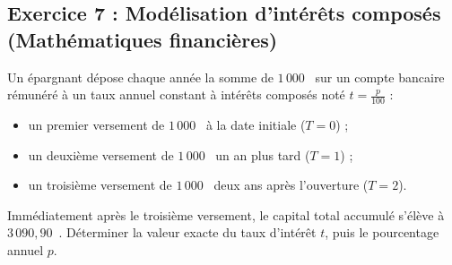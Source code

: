 \documentclass[11pt,a4paper]{article}
\providecommand{\euro}{\text{\officialeuro}}
\begin{document}
\subsection*{Exercice 7 : Modélisation d'intérêts composés (Mathématiques financières)}
Un épargnant dépose chaque année la somme de $1\,000$~\euro{} sur un compte bancaire rémunéré à un taux annuel constant à intérêts composés noté $t = \frac{p}{100}$ :
\begin{itemize}
    \item un premier versement de $1\,000$~\euro{} à la date initiale ($T = 0$) ;
    \item un deuxième versement de $1\,000$~\euro{} un an plus tard ($T = 1$) ;
    \item un troisième versement de $1\,000$~\euro{} deux ans après l'ouverture ($T = 2$).
\end{itemize}
Immédiatement après le troisième versement, le capital total accumulé s'élève à $3\,090{,}90$~\euro{}.
Déterminer la valeur exacte du taux d'intérêt $t$, puis le pourcentage annuel $p$.
\end{document}
